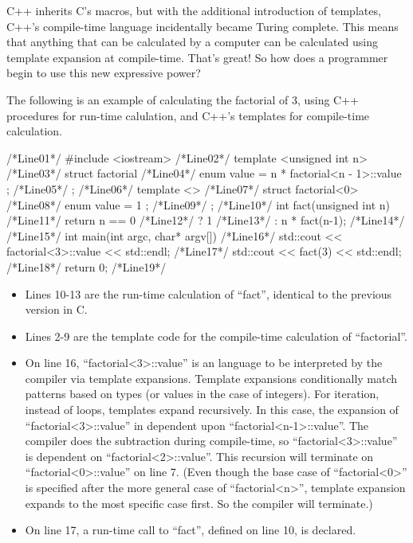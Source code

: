  C++ inherits C's macros, but with the additional introduction
 of templates, C++'s compile-time language
 incidentally became Turing complete.  This means that
 anything that can be
 calculated by a computer can be calculated using template expansion
 at compile-time.  That's great!  So how does a programmer begin to use this new
 expressive power?

 The following is an example of calculating the factorial of
 3, using C++ procedures for run-time calulation, and C++'s templates for compile-time
 calculation.

 \begin{examplecode}
 /*Line01*/  #include <iostream>
 /*Line02*/  template <unsigned int n>
 /*Line03*/  struct factorial {
 /*Line04*/      enum { value = n * factorial<n - 1>::value };
 /*Line05*/  };
 /*Line06*/  template <>
 /*Line07*/  struct factorial<0> {
 /*Line08*/      enum { value = 1 };
 /*Line09*/  };
 /*Line10*/  int fact(unsigned int n){
 /*Line11*/    return n == 0
 /*Line12*/      ? 1
 /*Line13*/      : n * fact(n-1);
 /*Line14*/  }
 /*Line15*/  int main(int argc, char* argv[]){
 /*Line16*/    std::cout << factorial<3>::value << std::endl;
 /*Line17*/    std::cout << fact(3) << std::endl;
 /*Line18*/    return 0;
 /*Line19*/  }
 \end{examplecode}

 \begin{itemize}
  \item
    Lines 10-13 are the run-time calculation of ``fact'', identical
    to the previous version in C.
  \item
   Lines 2-9 are the
   template code for the compile-time calculation of ``factorial''.
   \item
 On line 16, ``factorial\textless3\textgreater::value'' is an
 language to be interpreted
 by the compiler via template expansions.  Template expansions
 conditionally match patterns based on types (or values in the case
 of integers).  For iteration, instead of loops, templates expand recursively.
 In this case, the expansion of
 ``factorial\textless3\textgreater::value'' in dependent upon
 ``factorial\textless n-1\textgreater::value''.  The compiler
 does the subtraction during compile-time,
 so ``factorial\textless3\textgreater::value'' is dependent on
 ``factorial\textless2\textgreater::value''.
 This recursion will terminate on ``factorial\textless0\textgreater::value''
 on line 7. (Even though
 the base case of ``factorial\textless0\textgreater'' is specified
 after the more general
 case of ``factorial\textless n\textgreater'', template expansion expands to the most
 specific case first.  So the compiler will terminate.)

   \item
 On line 17, a run-time call to ``fact'', defined on line 10, is declared.
 \end{itemize}

